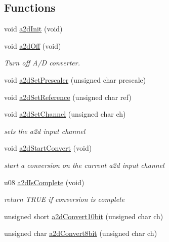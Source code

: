 \subsection*{Functions}
\begin{CompactItemize}
\item 
void \hyperlink{group__a2d_gd5a448cf42b0d27dccd39dd2ff10c191}{a2dInit} (void)
\item 
\hypertarget{group__a2d_g994ceed43d7aec7022b1eb764f59b68f}{
void \hyperlink{group__a2d_g994ceed43d7aec7022b1eb764f59b68f}{a2dOff} (void)}
\label{group__a2d_g994ceed43d7aec7022b1eb764f59b68f}

\begin{CompactList}\small\item\em Turn off A/D converter. \item\end{CompactList}\item 
void \hyperlink{group__a2d_gb062433b6cb21b50aa94e896bcd93b87}{a2dSetPrescaler} (unsigned char prescale)
\item 
void \hyperlink{group__a2d_g42bd5d9230c972339592df77a25d85ff}{a2dSetReference} (unsigned char ref)
\item 
\hypertarget{group__a2d_gef42c929bbdf795307bd60e83da80e58}{
void \hyperlink{group__a2d_gef42c929bbdf795307bd60e83da80e58}{a2dSetChannel} (unsigned char ch)}
\label{group__a2d_gef42c929bbdf795307bd60e83da80e58}

\begin{CompactList}\small\item\em sets the a2d input channel \item\end{CompactList}\item 
\hypertarget{group__a2d_g802949f5f047448a17a1cfb91ac1758e}{
void \hyperlink{group__a2d_g802949f5f047448a17a1cfb91ac1758e}{a2dStartConvert} (void)}
\label{group__a2d_g802949f5f047448a17a1cfb91ac1758e}

\begin{CompactList}\small\item\em start a conversion on the current a2d input channel \item\end{CompactList}\item 
\hypertarget{group__a2d_g1b77791393850966a323f0464d7694a2}{
u08 \hyperlink{group__a2d_g1b77791393850966a323f0464d7694a2}{a2dIsComplete} (void)}
\label{group__a2d_g1b77791393850966a323f0464d7694a2}

\begin{CompactList}\small\item\em return TRUE if conversion is complete \item\end{CompactList}\item 
unsigned short \hyperlink{group__a2d_ga7361811ca4e813838865bd87bf8e017}{a2dConvert10bit} (unsigned char ch)
\item 
unsigned char \hyperlink{group__a2d_gcc741350aaf6fdd70153838bf22ded02}{a2dConvert8bit} (unsigned char ch)
\end{CompactItemize}


